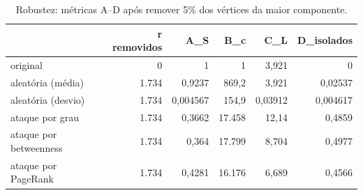 \begin{table}[htbp]
\centering
\small
\caption{Robustez: métricas A–D após remover 5\% dos vértices da maior componente.}
\label{tab:07_robustez}
\begin{tabular}{lrrrrr}
\toprule
 & r removidos & A\_S & B\_c & C\_L & D\_isolados \\
\midrule
original & 0 & 1 & 1 & 3,921 & 0 \\
aleatória (média) & 1.734 & 0,9237 & 869,2 & 3,921 & 0,02537 \\
aleatória (desvio) & 1.734 & 0,004567 & 154,9 & 0,03912 & 0,004617 \\
ataque por grau & 1.734 & 0,3662 & 17.458 & 12,14 & 0,4859 \\
ataque por betweenness & 1.734 & 0,364 & 17.799 & 8,704 & 0,4977 \\
ataque por PageRank & 1.734 & 0,4281 & 16.176 & 6,689 & 0,4566 \\
\bottomrule
\end{tabular}
\end{table}
